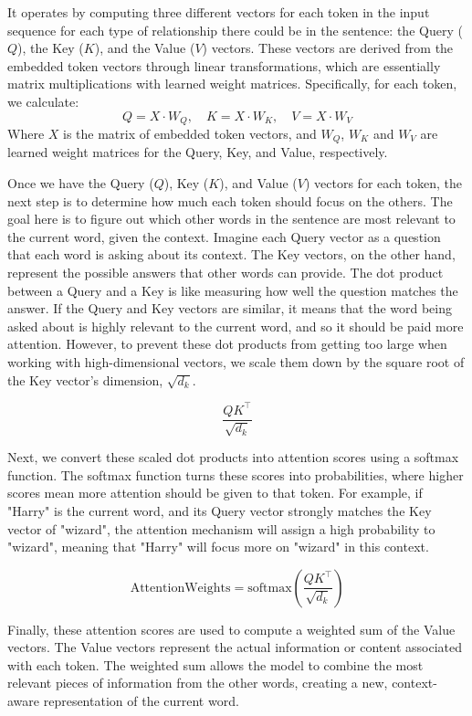 \documentclass[11pt]{article}
\begin{document}
\iffalse
It operates by computing three different vectors for each token in the input sequence for each type of relationship there could be in the sentence: the Query ($Q$), the Key ($K$), and the Value ($V$) vectors. These vectors are derived from the embedded token vectors through linear transformations, which are essentially matrix multiplications with learned weight matrices. Specifically, for each token, we calculate:
$$Q = X \cdot W_Q,\quad K = X\cdot W_K,\quad V = X \cdot W_V$$
Where $X$ is the matrix of embedded token vectors, and $W_Q$, $W_K$ and $W_V$ are learned weight matrices for the Query, Key, and Value, respectively.

Once we have the Query ($Q$), Key ($K$), and Value ($V$) vectors for each token, the next step is to determine how much each token should focus on the others. The goal here is to figure out which other words in the sentence are most relevant to the current word, given the context.
Imagine each Query vector as a question that each word is asking about its context. The Key vectors, on the other hand, represent the possible answers that other words can provide. The dot product between a Query and a Key is like measuring how well the question matches the answer. If the Query and Key vectors are similar, it means that the word being asked about is highly relevant to the current word, and so it should be paid more attention.
However, to prevent these dot products from getting too large when working with high-dimensional vectors, we scale them down by the square root of the Key vector's dimension, $\sqrt{d_k}$.

$$\frac{QK^\top}{\sqrt{d_k}}$$

Next, we convert these scaled dot products into attention scores using a softmax function. The softmax function turns these scores into probabilities, where higher scores mean more attention should be given to that token. For example, if "Harry" is the current word, and its Query vector strongly matches the Key vector of "wizard", the attention mechanism will assign a high probability to "wizard", meaning that "Harry" will focus more on "wizard" in this context.

$$\mathrm{Attention Weights} = \mathrm{softmax}\left(\frac{QK^\top}{\sqrt{d_k}}\right)$$

Finally, these attention scores are used to compute a weighted sum of the Value vectors. The Value vectors represent the actual information or content associated with each token. The weighted sum allows the model to combine the most relevant pieces of information from the other words, creating a new, context-aware representation of the current word.
\end{document}
